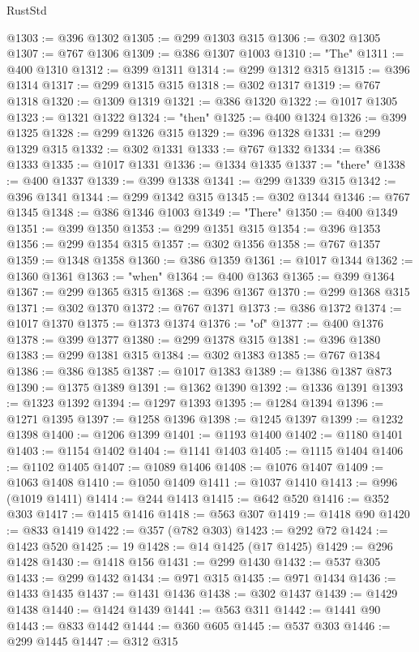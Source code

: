 \begin{lexlean}{RustStd}
\begin{coremodule}
@1303 := @396 @1302
@1305 := @299 @1303 @315
@1306 := @302 @1305
@1307 := @767 @1306
@1309 := @386 @1307 @1003
@1310 := "The"
@1311 := @400 @1310
@1312 := @399 @1311
@1314 := @299 @1312 @315
@1315 := @396 @1314
@1317 := @299 @1315 @315
@1318 := @302 @1317
@1319 := @767 @1318
@1320 := @1309 @1319
@1321 := @386 @1320
@1322 := @1017 @1305
@1323 := @1321 @1322
@1324 := "then"
@1325 := @400 @1324
@1326 := @399 @1325
@1328 := @299 @1326 @315
@1329 := @396 @1328
@1331 := @299 @1329 @315
@1332 := @302 @1331
@1333 := @767 @1332
@1334 := @386 @1333
@1335 := @1017 @1331
@1336 := @1334 @1335
@1337 := "there"
@1338 := @400 @1337
@1339 := @399 @1338
@1341 := @299 @1339 @315
@1342 := @396 @1341
@1344 := @299 @1342 @315
@1345 := @302 @1344
@1346 := @767 @1345
@1348 := @386 @1346 @1003
@1349 := "There"
@1350 := @400 @1349
@1351 := @399 @1350
@1353 := @299 @1351 @315
@1354 := @396 @1353
@1356 := @299 @1354 @315
@1357 := @302 @1356
@1358 := @767 @1357
@1359 := @1348 @1358
@1360 := @386 @1359
@1361 := @1017 @1344
@1362 := @1360 @1361
@1363 := "when"
@1364 := @400 @1363
@1365 := @399 @1364
@1367 := @299 @1365 @315
@1368 := @396 @1367
@1370 := @299 @1368 @315
@1371 := @302 @1370
@1372 := @767 @1371
@1373 := @386 @1372
@1374 := @1017 @1370
@1375 := @1373 @1374
@1376 := "of"
@1377 := @400 @1376
@1378 := @399 @1377
@1380 := @299 @1378 @315
@1381 := @396 @1380
@1383 := @299 @1381 @315
@1384 := @302 @1383
@1385 := @767 @1384
@1386 := @386 @1385
@1387 := @1017 @1383
@1389 := @1386 @1387 @873
@1390 := @1375 @1389
@1391 := @1362 @1390
@1392 := @1336 @1391
@1393 := @1323 @1392
@1394 := @1297 @1393
@1395 := @1284 @1394
@1396 := @1271 @1395
@1397 := @1258 @1396
@1398 := @1245 @1397
@1399 := @1232 @1398
@1400 := @1206 @1399
@1401 := @1193 @1400
@1402 := @1180 @1401
@1403 := @1154 @1402
@1404 := @1141 @1403
@1405 := @1115 @1404
@1406 := @1102 @1405
@1407 := @1089 @1406
@1408 := @1076 @1407
@1409 := @1063 @1408
@1410 := @1050 @1409
@1411 := @1037 @1410
@1413 := @996 (@1019 @1411)
@1414 := @244 @1413
@1415 := @642 @520
@1416 := @352 @303
@1417 := @1415 @1416
@1418 := @563 @307
@1419 := @1418 @90
@1420 := @833 @1419
@1422 := @357 (@782 @303)
@1423 := @292 @72
@1424 := @1423 @520
@1425 := 19
@1428 := @14 @1425 (@17 @1425)
@1429 := @296 @1428
@1430 := @1418 @156
@1431 := @299 @1430
@1432 := @537 @305
@1433 := @299 @1432
@1434 := @971 @315
@1435 := @971 @1434
@1436 := @1433 @1435
@1437 := @1431 @1436
@1438 := @302 @1437
@1439 := @1429 @1438
@1440 := @1424 @1439
@1441 := @563 @311
@1442 := @1441 @90
@1443 := @833 @1442
@1444 := @360 @605
@1445 := @537 @303
@1446 := @299 @1445
@1447 := @312 @315

\end{coremodule}
\end{lexlean}
